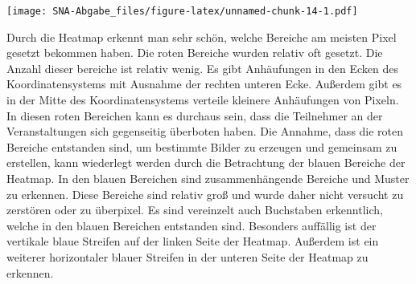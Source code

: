 \documentclass[
]{article}
\newenvironment{Shaded}{\begin{snugshade}}{\end{snugshade}}
\newcommand{\AttributeTok}[1]{\textcolor[rgb]{0.13,0.29,0.53}{#1}}
\newcommand{\CommentTok}[1]{\textcolor[rgb]{0.56,0.35,0.01}{\textit{#1}}}
\newcommand{\DecValTok}[1]{\textcolor[rgb]{0.00,0.00,0.81}{#1}}
\newcommand{\FloatTok}[1]{\textcolor[rgb]{0.00,0.00,0.81}{#1}}
\newcommand{\FunctionTok}[1]{\textcolor[rgb]{0.13,0.29,0.53}{\textbf{#1}}}
\newcommand{\NormalTok}[1]{#1}
\newcommand{\OtherTok}[1]{\textcolor[rgb]{0.56,0.35,0.01}{#1}}
\newcommand{\SpecialCharTok}[1]{\textcolor[rgb]{0.81,0.36,0.00}{\textbf{#1}}}
\newcommand{\StringTok}[1]{\textcolor[rgb]{0.31,0.60,0.02}{#1}}
\begin{document}
\begin{Shaded}
\end{Shaded}

\texttt{[image: SNA-Abgabe\_files/figure-latex/unnamed-chunk-14-1.pdf]}

Durch die Heatmap erkennt man sehr schön, welche Bereiche am meisten
Pixel gesetzt bekommen haben. Die roten Bereiche wurden relativ oft
gesetzt. Die Anzahl dieser bereiche ist relativ wenig. Es gibt
Anhäufungen in den Ecken des Koordinatensystems mit Ausnahme der rechten
unteren Ecke. Außerdem gibt es in der Mitte des Koordinatensystems
verteile kleinere Anhäufungen von Pixeln. In diesen roten Bereichen kann
es durchaus sein, dass die Teilnehmer an der Veranstaltungen sich
gegenseitig überboten haben. Die Annahme, dass die roten Bereiche
entstanden sind, um bestimmte Bilder zu erzeugen und gemeinsam zu
erstellen, kann wiederlegt werden durch die Betrachtung der blauen
Bereiche der Heatmap. In den blauen Bereichen sind zusammenhängende
Bereiche und Muster zu erkennen. Diese Bereiche sind relativ groß und
wurde daher nicht versucht zu zerstören oder zu überpixel. Es sind
vereinzelt auch Buchstaben erkenntlich, welche in den blauen Bereichen
entstanden sind. Besonders auffällig ist der vertikale blaue Streifen
auf der linken Seite der Heatmap. Außerdem ist ein weiterer horizontaler
blauer Streifen in der unteren Seite der Heatmap zu erkennen.
\end{document}
